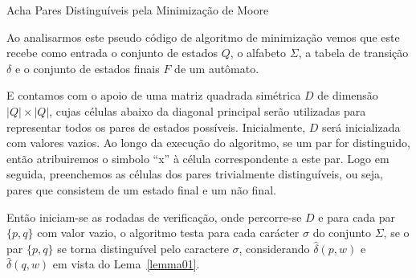 \documentclass[
	12pt,				%
	openany,
	oneside,
	a4paper,			%
	english,			%
	brazil				%
	]{abntex2}
\begin{document}
  \vspace{-0.5cm}
  \begin{algorithm}[H]
    \label{alg01}
    \caption{Acha Pares Distinguíveis pela Minimização de Moore}
  \end{algorithm}

  Ao analisarmos este pseudo código de algoritmo de minimização vemos que este recebe como entrada o conjunto de estados $Q$, o alfabeto $\Sigma$, a tabela de transição $\delta$ e o conjunto de estados finais $F$ de um autômato.

  E contamos com o apoio de uma matriz quadrada simétrica $D$ de dimensão $|Q|\times|Q|$, cujas células abaixo da diagonal principal serão utilizadas para representar todos os pares de estados possíveis. Inicialmente, $D$ será inicializada com valores vazios. Ao longo da execução do algoritmo, se um par for distinguido, então atribuiremos o simbolo “x” à célula correspondente a este par. Logo em seguida, preenchemos as células dos pares trivialmente distinguíveis, ou seja, pares que consistem de um estado final e um não final.

  Então iniciam-se as rodadas de verificação, onde percorre-se $D$ e para cada par $\{p, q\}$ com valor vazio, o algoritmo testa para cada carácter $\sigma$ do conjunto $\Sigma$, se o par $\{p, q\}$ se torna distinguível pelo caractere $\sigma$, considerando $\hat{\delta}(p, w)$ e $\hat{\delta}(q, w)$ em vista do Lema~\ref{lemma01}.
\end{document}
